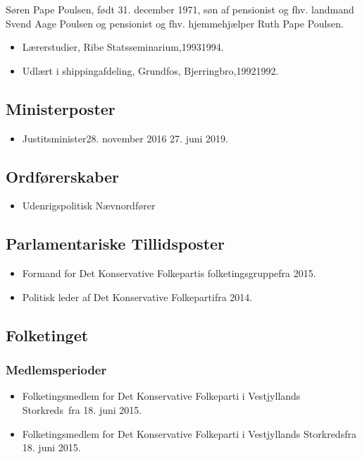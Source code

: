 \documentclass[11pt, a4paper]{awesome-cv}
\begin{document}
\makecvheader[R]
\makelettertitle
\begin{cvletter}
Søren Pape Poulsen, født 31. december 1971, søn af pensionist og fhv. landmand Svend Aage Poulsen og pensionist og fhv. hjemmehjælper Ruth Pape Poulsen.

\begin{itemize}
\item Lærerstudier, Ribe Statsseminarium,19931994.
\item Udlært i shippingafdeling, Grundfos, Bjerringbro,19921992.
\end{itemize}
\subsection*{Ministerposter}
\begin{itemize}
\item Justitsminister28. november 2016  27. juni 2019.
\end{itemize}
\subsection*{Ordførerskaber}
\begin{itemize}
\item Udenrigspolitisk Nævnordfører
\end{itemize}
\subsection*{Parlamentariske Tillidsposter}
\begin{itemize}
\item Formand for Det Konservative Folkepartis folketingsgruppefra 2015.
\item Politisk leder af Det Konservative Folkepartifra 2014.
\end{itemize}
\subsection*{Folketinget}
\subsubsection*{Medlemsperioder}
\begin{itemize}
\item Folketingsmedlem for Det Konservative Folkeparti i Vestjyllands Storkreds fra 18. juni 2015.
\item Folketingsmedlem for Det Konservative Folkeparti i Vestjyllands Storkredsfra 18. juni 2015.
\end{itemize}

\end{cvletter}
\end{document}
